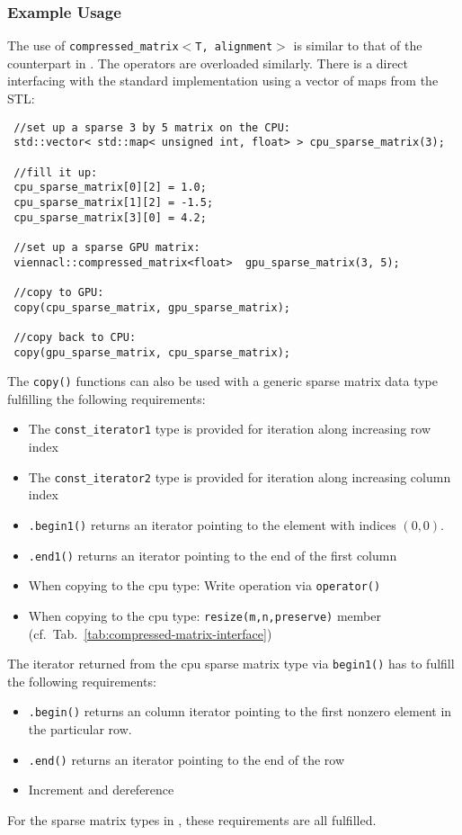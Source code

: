 \subsubsection{Example Usage} \label{sec:compressed-matrix-example}
The use of \texttt{compressed\_matrix$<$T, alignment$>$} is similar to that of the counterpart in {\ublas}. The operators are overloaded similarly.
There is a direct interfacing with the standard implementation using a vector of maps from the STL:
\begin{lstlisting}
 //set up a sparse 3 by 5 matrix on the CPU:
 std::vector< std::map< unsigned int, float> > cpu_sparse_matrix(3);

 //fill it up:
 cpu_sparse_matrix[0][2] = 1.0; 
 cpu_sparse_matrix[1][2] = -1.5; 
 cpu_sparse_matrix[3][0] = 4.2; 

 //set up a sparse GPU matrix:
 viennacl::compressed_matrix<float>  gpu_sparse_matrix(3, 5);

 //copy to GPU:
 copy(cpu_sparse_matrix, gpu_sparse_matrix);

 //copy back to CPU:
 copy(gpu_sparse_matrix, cpu_sparse_matrix);
\end{lstlisting}
The \texttt{copy()} functions can also be used with a generic sparse matrix data type fulfilling the following requirements:
\begin{itemize}
 \item The \texttt{const\_iterator1} type is provided for iteration along increasing row index
 \item The \texttt{const\_iterator2} type is provided for iteration along increasing column index
 \item \texttt{.begin1()} returns an iterator pointing to the element with indices $(0,0)$.
 \item \texttt{.end1()} returns an iterator pointing to the end of the first column
 \item When copying to the cpu type: Write operation via \texttt{operator()}
 \item When copying to the cpu type: \texttt{resize(m,n,preserve)} member (cf.~Tab.~\ref{tab:compressed-matrix-interface})
\end{itemize}
The iterator returned from the cpu sparse matrix type via \texttt{begin1()} has to fulfill the following requirements:
\begin{itemize}
 \item \texttt{.begin()} returns an column iterator pointing to the first nonzero element in the particular row.
 \item \texttt{.end()} returns an iterator pointing to the end of the row
 \item Increment and dereference
\end{itemize}
For the sparse matrix types in {\ublas}, these requirements are all fulfilled.

